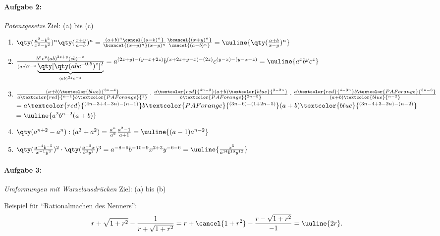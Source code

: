 \paragraph{Aufgabe 2: } \emph{Potenzgesetze} \hfill Ziel: (a) bis (c)\\[0.2cm]

\begin{enumerate}[label=(\alph*)]
    \item $\qty(\frac{a^2-b^2}{x^2-y^2})^n\qty(\frac{x+y}{a-b})^n = \frac{(a+b)^n \cancel{(a-b)^n}}{\bcancel{(x+y)^n}(x-y)^n} \frac{\bcancel{(x+y)^n}}{\cancel{(a-b)^n}} = \uuline{\qty(\frac{a+b}{x-y})^n}$
    \item $\frac{b^xc^y(ab)^{2z+y}(cb)^{-x}}{(ac)^{y-x}\underbrace{\qty[\qty(abc^{-0,5})^z]^2}_{(ab)^{2z} c^{-z}}} = a^{(2z + y)-(y-x+2z)} b^{(x+2z+y-x)-(2z)} c^{(y-x)-(y-x-z)} = \uuline{a^x b^y c^z}$
    \item $\frac{(a+b)\textcolor{blue}{^{3n-4}}}{a\textcolor{red}{^{n-1}}b\textcolor{PAForange}{^1}}\cdot\frac{a\textcolor{red}{^{4n-3}}(a+b)\textcolor{blue}{^{3-2n}}}{b\textcolor{PAForange}{^{2n-5}}}\cdot\frac{a\textcolor{red}{^{4-3n}}b\textcolor{PAForange}{^{3n-6}}}{(a+b)\textcolor{blue}{^{n-2}}} $\\
    $= a\textcolor{red}{^{(4n-3+4-3n)-(n-1)}} b\textcolor{PAForange}{^{(3n-6)-(1+2n-5)}} (a+b)\textcolor{blue}{^{(3n-4+3-2n)-(n-2)}} $ \\
    $= \uuline{a^2 b^{n-2}(a+b)}$
    \item $\qty(a^{n+2}-a^n):(a^3+a^2) = \frac{a^n}{a^2}\frac{a^2-1}{a+1} = \uuline{(a-1) a^{n-2}}$
    \item $\qty(\frac{a^{-4}b^{-5}}{x^{-1}y^3})^2\cdot\qty(\frac{a^{-2}x}{b^3y^2})^3 = a^{-8-6} b^{-10-9} x^{2+3} y^{-6-6} = \uuline{\frac{x^5}{a^{14} b^{19} y^{12}}}$
\end{enumerate}
%
\newpage
\paragraph{Aufgabe 3: } \emph{Umformungen mit Wurzelausdrücken} \hfill Ziel: (a) bis (b)\\[0.2cm]

Beispiel für ``Rationalmachen des Nenners'':
\begin{align}
    r + \sqrt{1+r^2} - \frac{1}{r+\sqrt{1+r^2}} = r + \cancel{1+r^2} - \frac{r-\sqrt{1+r^2}}{-1} = \uuline{2r}.
\end{align}

